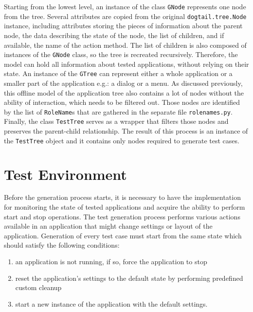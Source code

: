 Starting from the lowest level, an instance of the class \texttt{GNode} represents one node from the tree. Several attributes are copied from the original \texttt{dogtail.tree.Node} instance, including attributes storing the pieces of information about the parent node, the data describing the state of the node, the list of children, and if available, the name of the action method. The list of children is also composed of instances of the \texttt{GNode} class, so the tree is recreated recursively. Therefore, the model can hold all information about tested applications, without relying on their state. An instance of the \texttt{GTree} can represent either a whole application or a smaller part of the application e.g.: a dialog or a menu. As discussed previously, this offline model of the application tree also contains a lot of nodes without the ability of interaction, which needs to be filtered out. Those nodes are identified by the list of \texttt{RoleName}s that are gathered in the separate file \texttt{rolenames.py}. Finally, the class \texttt{TestTree} serves as a wrapper that filters those nodes and preserves the parent-child relationship. The result of this process is an instance of the \texttt{TestTree} object and it contains only nodes required to generate test cases. 

\section{Test Environment}
Before the generation process starts, it is necessary to have the implementation for monitoring the state of tested applications and acquire the ability to perform start and stop operations. The test generation process performs various actions available in an application that might change settings or layout of the application. Generation of every test case must start from the same state which should satisfy the following conditions: 
\begin{enumerate}
    \item an application is not running, if so, force the application to stop
    \item reset the application's settings to the default state by performing predefined custom cleanup
    \item start a new instance of the application with the default settings.
\end{enumerate}

